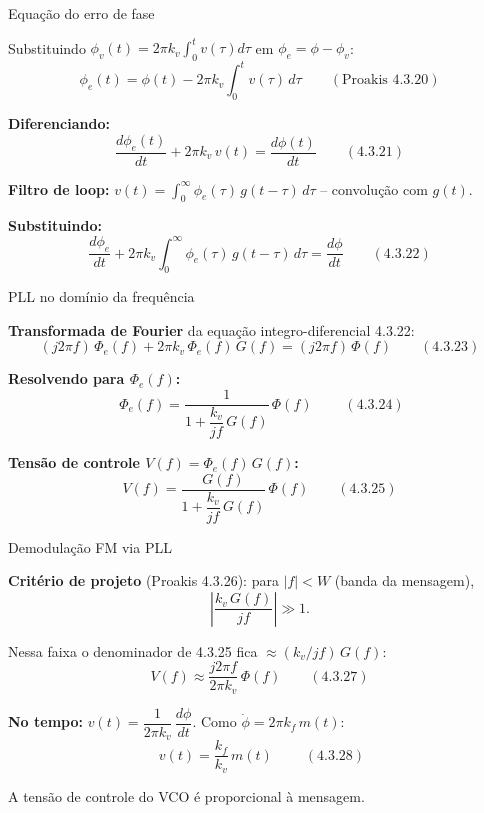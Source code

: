 
\begin{frame}{Equação do erro de fase}

Substituindo $\phi_v(t) = 2\pi k_v \!\int_0^t v(\tau)d\tau$ em $\phi_e = \phi - \phi_v$:
\[
\phi_e(t) = \phi(t) - 2\pi k_v \int_0^t v(\tau)\,d\tau \qquad (\text{Proakis 4.3.20})
\]

\pause
\textbf{Diferenciando:}
\[
\frac{d\phi_e(t)}{dt} + 2\pi k_v\,v(t) = \frac{d\phi(t)}{dt} \qquad (\text{4.3.21})
\]

\pause
\textbf{Filtro de loop:} $v(t) = \int_0^\infty \phi_e(\tau)\,g(t-\tau)\,d\tau$ -- convolução com $g(t)$.

\pause
\textbf{Substituindo:}
\[
\frac{d\phi_e}{dt} + 2\pi k_v\!\int_0^\infty\!\phi_e(\tau)\,g(t-\tau)\,d\tau = \frac{d\phi}{dt} \qquad (\text{4.3.22})
\]

\end{frame}


\begin{frame}{PLL no domínio da frequência}

\textbf{Transformada de Fourier} da equação integro-diferencial 4.3.22:
\[
(j2\pi f)\,\Phi_e(f) + 2\pi k_v\,\Phi_e(f)\,G(f) = (j2\pi f)\,\Phi(f) \qquad (\text{4.3.23})
\]

\pause
\textbf{Resolvendo para $\Phi_e(f)$:}
\[
\boxed{\;\Phi_e(f) = \frac{1}{1 + \dfrac{k_v}{jf}\,G(f)}\,\Phi(f)\;} \qquad (\text{4.3.24})
\]

\pause
\textbf{Tensão de controle $V(f) = \Phi_e(f)\,G(f)$:}
\[
V(f) = \frac{G(f)}{1 + \dfrac{k_v}{jf}\,G(f)}\,\Phi(f) \qquad (\text{4.3.25})
\]

\end{frame}


\begin{frame}{Demodulação FM via PLL}

\small\compacto

\textbf{Critério de projeto} (Proakis 4.3.26): para $|f| < W$ (banda da mensagem),
\[
\left|\dfrac{k_v\,G(f)}{jf}\right| \gg 1.
\]

\pause
Nessa faixa o denominador de 4.3.25 fica $\approx (k_v/jf)\,G(f)$:
\[
V(f) \approx \dfrac{j2\pi f}{2\pi k_v}\,\Phi(f) \qquad (\text{4.3.27})
\]

\pause
\textbf{No tempo:} $v(t) = \dfrac{1}{2\pi k_v}\,\dfrac{d\phi}{dt}$. Como $\dot\phi = 2\pi k_f\,m(t)$:
\[
\boxed{\;v(t) = \dfrac{k_f}{k_v}\,m(t)\;} \qquad (\text{4.3.28})
\]

A tensão de controle do VCO é proporcional à mensagem.

\end{frame}


